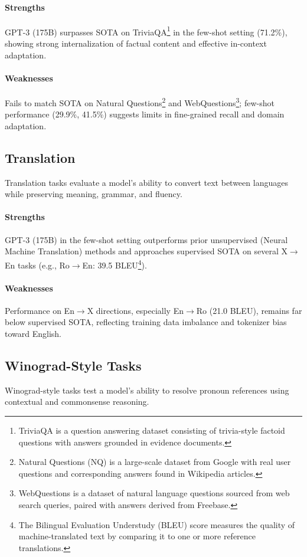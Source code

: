 \documentclass[10pt]{article}
\begin{document}
\paragraph{Strengths}
GPT-3 (175B) surpasses SOTA on TriviaQA\footnote{TriviaQA is a question answering dataset consisting of trivia-style factoid questions with answers grounded in evidence documents.} in the few-shot setting (71.2\%), showing strong internalization of factual content and effective in-context adaptation.

\paragraph{Weaknesses}
Fails to match SOTA on Natural Questions\footnote{Natural Questions (NQ) is a large-scale dataset from Google with real user questions and corresponding answers found in Wikipedia articles.} and WebQuestions\footnote{WebQuestions is a dataset of natural language questions sourced from web search queries, paired with answers derived from Freebase.}; few-shot performance (29.9\%, 41.5\%) suggests limits in fine-grained recall and domain adaptation.


\subsection*{Translation}
Translation tasks evaluate a model's ability to convert text between languages while preserving meaning, grammar, and fluency.

\paragraph{Strengths}
GPT-3 (175B) in the few-shot setting outperforms prior unsupervised (Neural Machine Translation) methods and approaches supervised SOTA on several X$\rightarrow$En tasks (e.g., Ro$\rightarrow$En: 39.5 BLEU\footnote{The Bilingual Evaluation Understudy (BLEU) score measures the quality of machine-translated text by comparing it to one or more reference translations.}).

\paragraph{Weaknesses}
Performance on En$\rightarrow$X directions, especially En$\rightarrow$Ro (21.0 BLEU), remains far below supervised SOTA, reflecting training data imbalance and tokenizer bias toward English.


\subsection*{Winograd-Style Tasks}
Winograd-style tasks test a model's ability to resolve pronoun references using contextual and commonsense reasoning.
\end{document}
